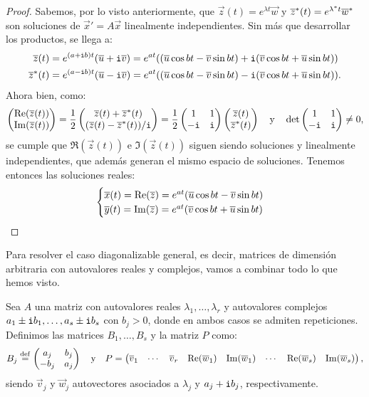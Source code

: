 \documentclass[../ecuaciones_diferenciales.tex]{subfiles}
\begin{document}
\begin{proof}
	Sabemos, por lo visto anteriormente, que 
	\(\vec{z}(t) = e^{\lambda t} \vec{w}\) y
	\({\overline{z}}^\ast(t) = e^{{\lambda}^\ast t} {\overline{w}}^\ast\)
	son soluciones de \(\vec{x}' = A\vec{x}\) 
	linealmente independientes. Sin más que desarrollar los productos, se
	llega a:
	\begin{align*}
		\overline{z}(t) &= e^{(a + \mathtt{i} b)t} (\overline{u} + \mathtt{i}\overline{v}) 
		= e^{at} ((\overline{u}\cos bt - \overline{v}\sin bt) 
		+ \mathtt{i}(\overline{v}\cos bt +\overline{u}\sin bt)) \\
		{\overline{z}}^\ast(t) &= e^{(a - \mathtt{i} b)t} (\overline{u} - \mathtt{i}\overline{v}) 
		= e^{at} ((\overline{u}\cos bt - \overline{v}\sin bt) 
		- \mathtt{i}(\overline{v}\cos bt + \overline{u}\sin bt)).
	\end{align*}
	Ahora bien, como:
	\[\begin{pmatrix}\mathrm{Re}(\overline{z}(t)) \\ \mathrm{Im}(\overline{z}(t))\end{pmatrix} 
		= \frac{1}{2} \begin{pmatrix}\overline{z}(t) + {\overline{z}}^\ast(t) \\
			(\overline{z}(t) - {\overline{z}}^\ast(t))/\mathtt{i}\end{pmatrix} 
		= \frac{1}{2}\begin{pmatrix}1 & 1 \\ -\mathtt{i} & \mathtt{i}\end{pmatrix} 
		\begin{pmatrix}\overline{z}(t) \\ {\overline{z}}^\ast(t)\end{pmatrix} 
		\quad \text{y} \quad 
		\det\begin{pmatrix}1 & 1 \\ -\mathtt{i} & \mathtt{i}\end{pmatrix} \neq 0,\]
	se cumple que \(\Re(\vec{z}(t))\) e \(\Im(\vec{z}(t))\) siguen siendo 
	soluciones y linealmente independientes, que además generan el mismo 
	espacio de soluciones. Tenemos entonces las soluciones reales:
	\[\begin{cases}
		\overline{x}(t) = \mathrm{Re}(\overline{z}) = e^{at}(\overline{u}\cos bt - \overline{v}\sin bt) \\
		\overline{y}(t) = \mathrm{Im}(\overline{z}) = e^{at}(\overline{v}\cos bt + \overline{u}\sin bt)\end{cases}\]
\end{proof}

Para resolver el caso diagonalizable general, es decir, matrices de dimensión
arbitraria con autovalores reales y complejos, vamos a combinar todo lo que 
hemos visto. 

Sea \(A\) una matriz con autovalores reales \(\lambda_1, \dots, \lambda_r\)
y autovalores complejos \(a_1 \pm \mathtt{i} b_1, \dots, a_s \pm \mathtt{i} b_s\) con 
\(b_j > 0\), donde en ambos casos se admiten repeticiones. 
Definimos las matrices \(B_1, \dots, B_s\) y la matriz \(P\) como:
\[B_j \overset{\operatorname{def}}{=} \begin{pmatrix}a_j & b_j \\ -b_j & a_j\end{pmatrix} 
	\quad \text{y} \quad
	P = \begin{pmatrix}\overline{v}_1 & \cdots & \overline{v}_r 
		& \mathrm{Re}(\overline{w}_1) & \mathrm{Im}(\overline{w}_1) & 
		\cdots & \mathrm{Re}(\overline{w}_s) & \mathrm{Im}(\overline{w}_s)\end{pmatrix},\]
siendo \(\vec{v}_j\) y \(\vec{w}_j\) autovectores asociados a \(\lambda_j\) 
y \(a_j + \mathtt{i} b_j\), respectivamente.
\end{document}
